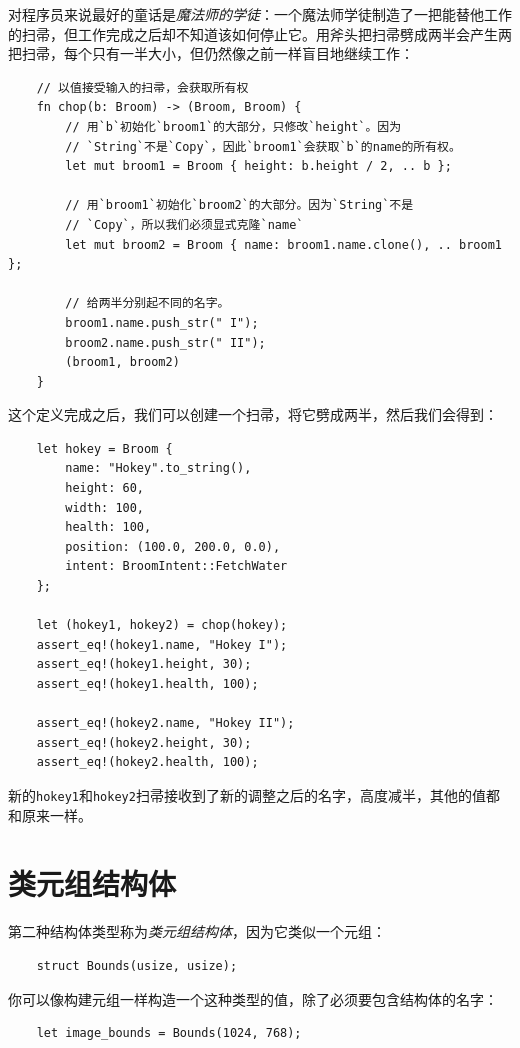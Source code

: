 对程序员来说最好的童话是\emph{魔法师的学徒}：一个魔法师学徒制造了一把能替他工作的扫帚，但工作完成之后却不知道该如何停止它。用斧头把扫帚劈成两半会产生两把扫帚，每个只有一半大小，但仍然像之前一样盲目地继续工作：
\begin{verbatim}
    // 以值接受输入的扫帚，会获取所有权
    fn chop(b: Broom) -> (Broom, Broom) {
        // 用`b`初始化`broom1`的大部分，只修改`height`。因为
        // `String`不是`Copy`，因此`broom1`会获取`b`的name的所有权。
        let mut broom1 = Broom { height: b.height / 2, .. b };

        // 用`broom1`初始化`broom2`的大部分。因为`String`不是
        // `Copy`，所以我们必须显式克隆`name`
        let mut broom2 = Broom { name: broom1.name.clone(), .. broom1 };

        // 给两半分别起不同的名字。
        broom1.name.push_str(" I");
        broom2.name.push_str(" II");
        (broom1, broom2)
    }
\end{verbatim}

这个定义完成之后，我们可以创建一个扫帚，将它劈成两半，然后我们会得到：
\begin{verbatim}
    let hokey = Broom {
        name: "Hokey".to_string(),
        height: 60,
        width: 100,
        health: 100,
        position: (100.0, 200.0, 0.0),
        intent: BroomIntent::FetchWater
    };

    let (hokey1, hokey2) = chop(hokey);
    assert_eq!(hokey1.name, "Hokey I");
    assert_eq!(hokey1.height, 30);
    assert_eq!(hokey1.health, 100);

    assert_eq!(hokey2.name, "Hokey II");
    assert_eq!(hokey2.height, 30);
    assert_eq!(hokey2.health, 100);
\end{verbatim}

新的\texttt{hokey1}和\texttt{hokey2}扫帚接收到了新的调整之后的名字，高度减半，其他的值都和原来一样。

\section{类元组结构体}

第二种结构体类型称为\emph{类元组结构体}，因为它类似一个元组：
\begin{verbatim}
    struct Bounds(usize, usize);
\end{verbatim}

你可以像构建元组一样构造一个这种类型的值，除了必须要包含结构体的名字：
\begin{verbatim}
    let image_bounds = Bounds(1024, 768);
\end{verbatim}


